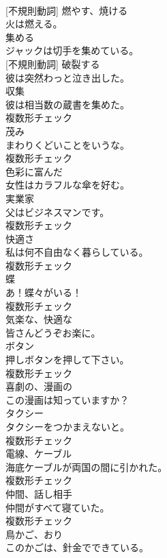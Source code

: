 \documentclass[8pt]{extreport}
\begin{document}
\begin{CJK}{UTF8}{min}
\\	[動詞] [不規則動詞]	燃やす、焼ける	
\\	火は燃える。	
\\	[動詞]	集める	
\\	ジャックは切手を集めている。	
\\	[動詞] [不規則動詞]	破裂する	
\\	彼は突然わっと泣き出した。	
\\	[名詞]	収集	
\\	彼は相当数の蔵書を集めた。	
\\	複数形チェック
\\	[名詞]	茂み	
\\	まわりくどいことをいうな。	
\\	複数形チェック
\\	[形容詞]	色彩に富んだ	
\\	女性はカラフルな傘を好む。	
\\	[名詞]	実業家	
\\	父はビジネスマンです。	
\\	複数形チェック
\\	[名詞]	快適さ	
\\	私は何不自由なく暮らしている。	
\\	複数形チェック
\\	[名詞]	蝶	
\\	あ！蝶々がいる！	
\\	複数形チェック
\\	[形容詞]	気楽な、快適な	
\\	皆さんどうぞお楽に。	
\\	[名詞]	ボタン	
\\	押しボタンを押して下さい。	
\\	複数形チェック
\\	[形容詞]	喜劇の、漫画の	
\\	この漫画は知っていますか？	
\\	[名詞]	タクシー	
\\	タクシーをつかまえないと。	
\\	複数形チェック
\\	[名詞]	電線、ケーブル	
\\	海底ケーブルが両国の間に引かれた。	
\\	複数形チェック
\\	[名詞]	仲間、話し相手	
\\	仲間がすべて寝ていた。	
\\	複数形チェック
\\	[名詞]	鳥かご、おり	
\\	このかごは、針金でできている。	

\end{CJK}
\end{document}
